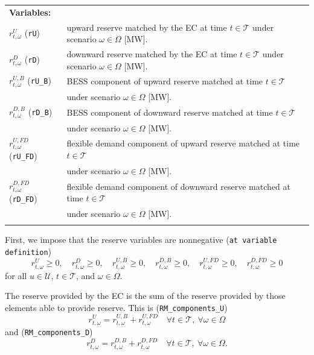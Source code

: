 \documentclass{article}
\begin{document}
\begin{tabularx}{\textwidth}{l l}
    \textbf{Variables:} \\
	$r^{U}_{t, \omega}$ (\verb|rU|) & upward reserve matched by the EC at time $t \in \mathcal{T}$ under scenario $\omega \in \Omega$ [MW]. \\
    $r^{D}_{t, \omega}$ (\verb|rD|) & downward reserve matched by the EC at time $t \in \mathcal{T}$ under scenario $\omega \in \Omega$ [MW]. \\
    $r^{U, B}_{t, \omega}$ (\verb|rU_B|) & BESS component of upward reserve matched at time $t \in \mathcal{T}$ \\
    & under scenario $\omega \in \Omega$ [MW]. \\
    $r^{D, B}_{t, \omega}$ (\verb|rD_B|) & BESS component of downward reserve matched at time $t \in \mathcal{T}$ \\
    & under scenario $\omega \in \Omega$ [MW]. \\
    $r^{U, FD}_{t, \omega}$ (\verb|rU_FD|) & flexible demand component of upward reserve matched at time $t \in \mathcal{T}$ \\
    & under scenario $\omega \in \Omega$ [MW]. \\
    $r^{D, FD}_{t, \omega}$ (\verb|rD_FD|) & flexible demand component of downward reserve matched at time $t \in \mathcal{T}$ \\
    & under scenario $\omega \in \Omega$ [MW]. \\
    \\
\end{tabularx}

First, we impose that the reserve variables are nonnegative (\verb|at variable definition|)
\begin{equation} \label{EQ:RVarDef}
    r^{U}_{t, \omega} \geq 0, \quad r^{D}_{t, \omega} \geq 0, \quad r^{U, B}_{t, \omega} \geq 0, \quad r^{D, B}_{t, \omega} \geq 0, \quad r^{U, FD}_{t, \omega} \geq 0, \quad r^{D, FD}_{t, \omega} \geq 0
\end{equation}
for all $u \in \mathcal{U}$, $t \in \mathcal{T}$, and $\omega \in \Omega$. 

The reserve provided by the EC is the sum of the reserve provided by those elements able to provide reserve. This is (\verb|RM_components_U|)
\begin{equation} \label{EQ:RUcomp}
    r^{U}_{t, \omega} = r^{U, B}_{t, \omega} +  r^{U, FD}_{t, \omega} \quad \forall t \in \mathcal{T}, \ \forall \omega \in \Omega
\end{equation}
and (\verb|RM_components_D|)
\begin{equation} \label{EQ:RDcomp}
	r^{D}_{t, \omega} = r^{D, B}_{t, \omega} +  r^{D, FD}_{t, \omega} \quad \forall t \in \mathcal{T}, \ \forall \omega \in \Omega.
\end{equation}
\end{document}
